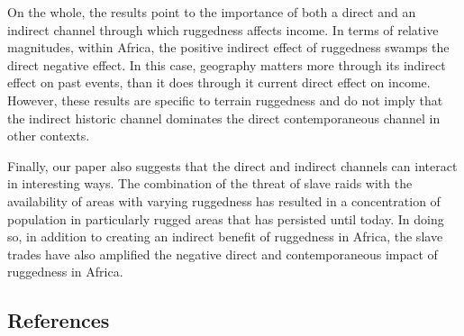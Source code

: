\documentclass[
  letterpaper,
  DIV=11,
  numbers=noendperiod]{scrartcl}
\begin{document}
On the whole, the results point to the importance of both a direct and
an indirect channel through which ruggedness affects income. In terms of
relative magnitudes, within Africa, the positive indirect effect of
ruggedness swamps the direct negative effect. In this case, geography
matters more through its indirect effect on past events, than it does
through it current direct effect on income. However, these results are
specific to terrain ruggedness and do not imply that the indirect
historic channel dominates the direct contemporaneous channel in other
contexts.

Finally, our paper also suggests that the direct and indirect channels
can interact in interesting ways. The combination of the threat of slave
raids with the availability of areas with varying ruggedness has
resulted in a concentration of population in particularly rugged areas
that has persisted until today. In doing so, in addition to creating an
indirect benefit of ruggedness in Africa, the slave trades have also
amplified the negative direct and contemporaneous impact of ruggedness
in Africa.

\subsection{References}\label{references}
\end{document}
